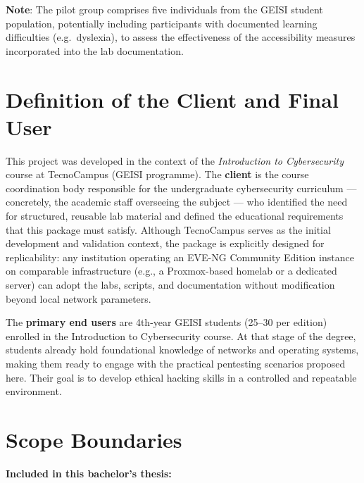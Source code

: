 \textbf{Note}: The pilot group comprises five individuals from the GEISI student
population, potentially including participants with documented learning
difficulties (e.g.\ dyslexia), to assess the effectiveness of the
accessibility measures incorporated into the lab documentation.

\section{Definition of the Client and Final User}

This project was developed in the context of the \textit{Introduction to
Cybersecurity} course at TecnoCampus (GEISI programme). The \textbf{client}
is the course coordination body responsible for the undergraduate cybersecurity
curriculum --- concretely, the academic staff overseeing the subject --- who
identified the need for structured, reusable lab material and defined the
educational requirements that this package must satisfy.
Although TecnoCampus serves as the initial development and validation context,
the package is explicitly designed for replicability: any institution operating
an EVE-NG Community Edition instance on comparable infrastructure (e.g.,
a Proxmox-based homelab or a dedicated server) can adopt the labs, scripts,
and documentation without modification beyond local network parameters.

The \textbf{primary end users} are 4th-year GEISI students (25--30 per
edition) enrolled in the Introduction to Cybersecurity course. At that stage
of the degree, students already hold foundational knowledge of networks and
operating systems, making them ready to engage with the practical pentesting
scenarios proposed here. Their goal is to develop ethical hacking skills in a
controlled and repeatable environment.

\section{Scope Boundaries}

\textbf{Included in this bachelor's thesis:}

